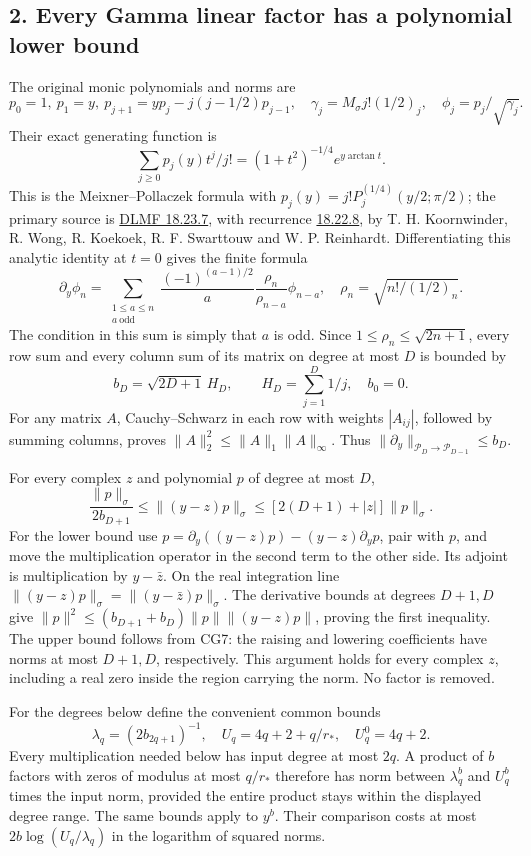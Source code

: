 \subsection{2. Every Gamma linear factor has a polynomial lower bound}\label{every-gamma-linear-factor-has-a-polynomial-lower-bound}

The original monic polynomials and norms are \[
p_0=1,\ p_1=y,\ p_{j+1}=yp_j-j(j-1/2)p_{j-1},
\quad \gamma_j=M_\sigma j!(1/2)_j,
\quad \phi_j=p_j/\sqrt{\gamma_j}.
\tag{CG7}
\] Their exact generating function is \[
\sum_{j\ge0}p_j(y)t^j/j!=(1+t^2)^{-1/4}e^{y\arctan t}.
\tag{CG8}
\] This is the Meixner--Pollaczek formula with \(p_j(y)=j!P_j^{(1/4)}(y/2;\pi/2)\); the primary source is \href{https://dlmf.nist.gov/18.23.E7}{DLMF 18.23.7}, with recurrence \href{https://dlmf.nist.gov/18.22.E8}{18.22.8}, by T. H. Koornwinder, R. Wong, R. Koekoek, R. F. Swarttouw and W. P. Reinhardt. Differentiating this analytic identity at \(t=0\) gives the finite formula \[
\partial_y\phi_n
=\sum_{\substack{1\le a\le n\\a\ \mathrm{odd}}}
\frac{(-1)^{(a-1)/2}}a\frac{\rho_n}{\rho_{n-a}}\phi_{n-a},
\quad\rho_n=\sqrt{n!/(1/2)_n}.
\tag{CG9}
\] The condition in this sum is simply that \(a\) is odd. Since \(1\le\rho_n\le\sqrt{2n+1}\), every row sum and every column sum of its matrix on degree at most \(D\) is bounded by \[
b_D=\sqrt{2D+1}\,H_D,\qquad H_D=\sum_{j=1}^D1/j,
\quad b_0=0.
\tag{CG10}
\] For any matrix \(A\), Cauchy--Schwarz in each row with weights \(|A_{ij}|\), followed by summing columns, proves \(\|A\|_2^2\le\|A\|_1\|A\|_\infty\). Thus \(\|\partial_y\|_{\mathcal P_D\to\mathcal P_{D-1}}\le b_D\).

For every complex \(z\) and polynomial \(p\) of degree at most \(D\), \[
\boxed{\frac{\|p\|_\sigma}{2b_{D+1}}
\le\|(y-z)p\|_\sigma
\le[2(D+1)+|z|]\|p\|_\sigma.}
\tag{CG11}
\] For the lower bound use \(p=\partial_y((y-z)p)-(y-z)\partial_yp\), pair with \(p\), and move the multiplication operator in the second term to the other side. Its adjoint is multiplication by \(y-\bar z\). On the real integration line \(\|(y-z)p\|_\sigma=\|(y-\bar z)p\|_\sigma\). The derivative bounds at degrees \(D+1,D\) give \(\|p\|^2\le(b_{D+1}+b_D)\|p\|\|(y-z)p\|\), proving the first inequality. The upper bound follows from CG7: the raising and lowering coefficients have norms at most \(D+1,D\), respectively. This argument holds for every complex \(z\), including a real zero inside the region carrying the norm. No factor is removed.

For the degrees below define the convenient common bounds \[
\lambda_q=(2b_{2q+1})^{-1},\quad
U_q=4q+2+q/r_*,\quad U_q^0=4q+2.
\tag{CG12}
\] Every multiplication needed below has input degree at most \(2q\). A product of \(b\) factors with zeros of modulus at most \(q/r_*\) therefore has norm between \(\lambda_q^b\) and \(U_q^b\) times the input norm, provided the entire product stays within the displayed degree range. The same bounds apply to \(y^b\). Their comparison costs at most \(2b\log(U_q/\lambda_q)\) in the logarithm of squared norms.


